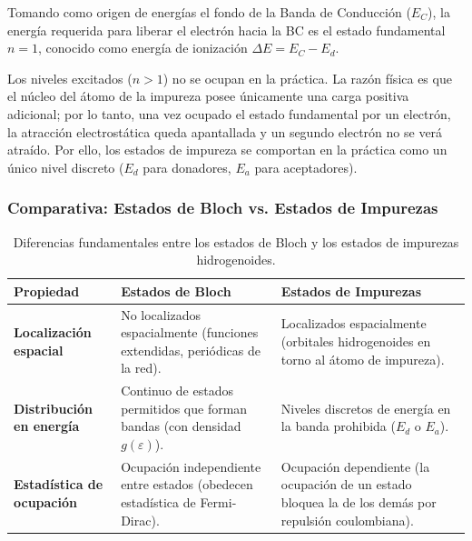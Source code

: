 \begin{concepto}
Tomando como origen de energías el fondo de la Banda de Conducción ($E_C$), la energía requerida para liberar el electrón hacia la BC es el estado fundamental $n=1$, conocido como energía de ionización $\Delta E = E_C - E_d$.

Los niveles excitados ($n > 1$) no se ocupan en la práctica. La razón física es que el núcleo del átomo de la impureza posee únicamente una carga positiva adicional; por lo tanto, una vez ocupado el estado fundamental por un electrón, la atracción electrostática queda apantallada y un segundo electrón no se verá atraído. Por ello, los estados de impureza se comportan en la práctica como un único nivel discreto ($E_d$ para donadores, $E_a$ para aceptadores).
\end{concepto}

\subsubsection{Comparativa: Estados de Bloch vs. Estados de Impurezas}

\begin{table}[h!]
\centering
\begin{tabularx}{\textwidth}{
  >{\raggedright\arraybackslash}X
  >{\raggedright\arraybackslash}X
  >{\raggedright\arraybackslash}X
}
\toprule
\textbf{Propiedad} & \textbf{Estados de Bloch} & \textbf{Estados de Impurezas} \\
\midrule
\textbf{Localización espacial} & No localizados espacialmente (funciones extendidas, periódicas de la red). & Localizados espacialmente (orbitales hidrogenoides en torno al átomo de impureza). \\
\addlinespace
\textbf{Distribución en energía} & Continuo de estados permitidos que forman bandas (con densidad $g(\varepsilon)$). & Niveles discretos de energía en la banda prohibida ($E_d$ o $E_a$). \\
\addlinespace
\textbf{Estadística de ocupación} & Ocupación independiente entre estados (obedecen estadística de Fermi-Dirac). & Ocupación dependiente (la ocupación de un estado bloquea la de los demás por repulsión coulombiana). \\
\bottomrule
\end{tabularx}
\caption{Diferencias fundamentales entre los estados de Bloch y los estados de impurezas hidrogenoides.}
\end{table}
\newpage

